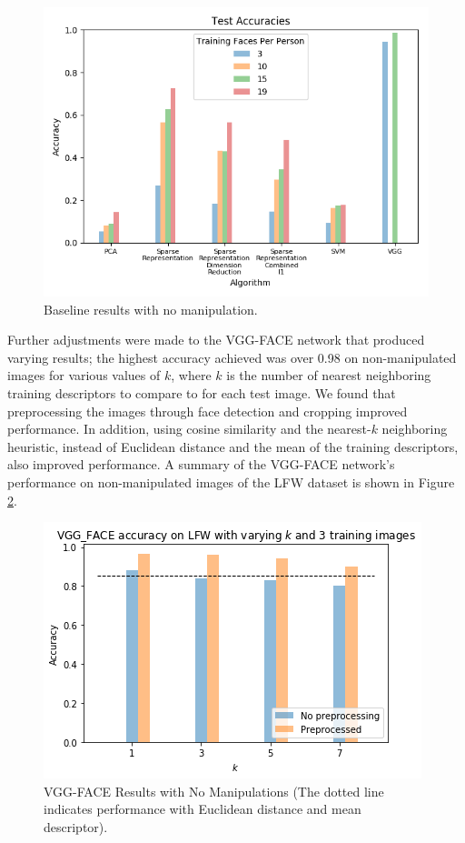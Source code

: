 \documentclass[pageno]{cos429}
\begin{document}
\begin{figure}
\centering
\includegraphics[scale=0.5]{../figures/results_plots/default_accuracies_difftraintest.png}
\caption{Baseline results with no manipulation.}
\label{fig:baseline}
\end{figure}

Further adjustments were made to the VGG-FACE network that produced varying results; the highest accuracy achieved was over 0.98 on non-manipulated images for various values of $k$, where $k$ is the number of nearest neighboring training descriptors to compare to for each test image. We found that preprocessing the images through face detection and cropping improved performance. In addition, using cosine similarity and the nearest-$k$ neighboring heuristic, instead of Euclidean distance and the mean of the training descriptors, also improved performance. A summary of the VGG-FACE network's performance on non-manipulated images of the LFW dataset is shown in Figure \ref{fig:vgg_nonmanipulated}. 

\begin{figure}
\centering
\includegraphics[scale=0.5]{../figures/results_plots/vgg_1.png}
\caption{VGG-FACE Results with No Manipulations (The dotted line indicates performance with Euclidean distance and mean descriptor).}
\label{fig:vgg_nonmanipulated}
\end{figure}
\end{document}
